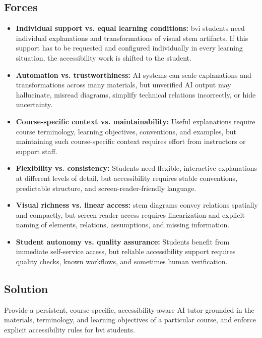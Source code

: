\subsection*{Forces}
\renewcommand*\labelitemi{\textbullet}
\begin{itemize}
    \item \textbf{Individual support vs. equal learning conditions:} \ac{bvi} students need individual explanations and transformations of visual \ac{stem} artifacts. If this support has to be requested and configured individually in every learning situation, the accessibility work is shifted to the student.
    \item \textbf{Automation vs. trustworthiness:} AI systems can scale explanations and transformations across many materials, but unverified AI output may hallucinate, misread diagrams, simplify technical relations incorrectly, or hide uncertainty.
    \item \textbf{Course-specific context vs. maintainability:} Useful explanations require course terminology, learning objectives, conventions, and examples, but maintaining such course-specific context requires effort from instructors or support staff.
    \item \textbf{Flexibility vs. consistency:} Students need flexible, interactive explanations at different levels of detail, but accessibility requires stable conventions, predictable structure, and screen-reader-friendly language.
    \item \textbf{Visual richness vs. linear access:} \ac{stem} diagrams convey relations spatially and compactly, but screen-reader access requires linearization and explicit naming of elements, relations, assumptions, and missing information.
    \item \textbf{Student autonomy vs. quality assurance:} Students benefit from immediate self-service access, but reliable accessibility support requires quality checks, known workflows, and sometimes human verification.
\end{itemize}

\subsection*{Solution}

\begin{sol}
Provide a persistent, course-specific, accessibility-aware AI tutor grounded in the materials, terminology, and learning objectives of a particular course, and enforce explicit accessibility rules for \ac{bvi} students.
\end{sol}

